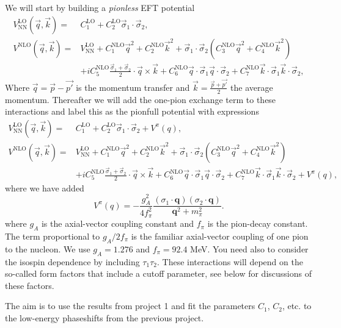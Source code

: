 \documentclass[%
oneside,                 %
final,                   %
10pt]{article}
\begin{document}
We will start by building  a \emph{pionless} EFT potential
\begin{align*}
V^\mathrm{LO}_\mathrm{NN}(\vec{q},\vec{k})=&C^\mathrm{LO}_1+C^\mathrm{LO}_2\vec{\sigma}_1\cdot\vec{\sigma}_2,\\
V^\mathrm{NLO}(\vec{q},\vec{k})=&V^\mathrm{LO}_\mathrm{NN}+C^\mathrm{NLO}_1\vec{q}^2+C^\mathrm{NLO}_2\vec{k}^2+
\vec{\sigma}_1\cdot\vec{\sigma}_2\left(C^\mathrm{NLO}_3\vec{q}^2+C^\mathrm{NLO}_4\vec{k}^2\right)\\
&+iC^\mathrm{NLO}_5\frac{\vec{\sigma}_1+\vec{\sigma}_2}{2}\cdot\vec{q}\times\vec{k}+C^\mathrm{NLO}_6\vec{q}\cdot\vec{\sigma}_1\vec{q}\cdot\vec{\sigma}_2
+C^\mathrm{NLO}_7\vec{k}\cdot\vec{\sigma}_1\vec{k}\cdot\vec{\sigma}_2,
\end{align*}
Where $\vec{q}=\vec{p}-\vec{p'}$ is the momentum transfer and $\vec{k}=\frac{\vec{p}+\vec{p'}}{2}$ the average momentum.
Thereafter we will add the one-pion exchange term to these interactions and label this
as the pionfull potential with expressions
\begin{align*}
V^\mathrm{LO}_\mathrm{NN}(\vec{q},\vec{k})=&C^\mathrm{LO}_1+C^\mathrm{LO}_2\vec{\sigma}_1\cdot\vec{\sigma}_2+V^{\pi}(q),\\
V^\mathrm{NLO}(\vec{q},\vec{k})=&V^\mathrm{LO}_\mathrm{NN}+C^\mathrm{NLO}_1\vec{q}^2+C^\mathrm{NLO}_2\vec{k}^2+
\vec{\sigma}_1\cdot\vec{\sigma}_2\left(C^\mathrm{NLO}_3\vec{q}^2+C^\mathrm{NLO}_4\vec{k}^2\right)\\
&+iC^\mathrm{NLO}_5\frac{\vec{\sigma}_1+\vec{\sigma}_2}{2}\cdot\vec{q}\times\vec{k}+C^\mathrm{NLO}_6\vec{q}\cdot\vec{\sigma}_1\vec{q}\cdot\vec{\sigma}_2
+C^\mathrm{NLO}_7\vec{k}\cdot\vec{\sigma}_1\vec{k}\cdot\vec{\sigma}_2+V^{\pi}(q),
\end{align*}
where we have added
\[
V^{\pi}(q)=-\frac{g_A^{2}}{4f_{\pi}^2}
\frac{(\sigma_{1}\cdot\mathbf{q})(\sigma_{2}\cdot\mathbf{q})}{\mathbf{q}^{2}+m_{\pi}^{2}}.
\]
where $g_A$ is the axial-vector coupling constant and $f_{\pi}$ is the pion-decay constant. The term
proportional to $g_A/2f_{\pi}$ is the familiar axial-vector coupling of one pion to the nucleon.
We use $g_A = 1.276$ and $f_{\pi}=92.4$ MeV.
You need also to consider the isospin dependence by including $\tau_{1}\tau_{2}$. These interactions will depend on the so-called form factors that include a
cutoff parameter, see below for discussions of these factors.

The aim is to use the results from project 1 and
fit the parameters $C_1$, $C_2$, etc. to the low-energy phaseshifts from the previous project.  
\end{document}
